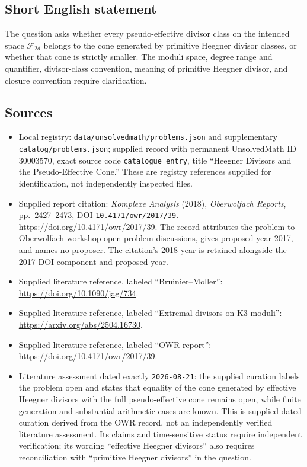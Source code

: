 \documentclass[11pt]{article}
\begin{document}
\subsection{Short English statement}
The question asks whether every pseudo-effective divisor class on the intended space \(\mathcal F_{2d}\) belongs to the cone generated by primitive Heegner divisor classes, or whether that cone is strictly smaller. The moduli space, degree range and quantifier, divisor-class convention, meaning of primitive Heegner divisor, and closure convention require clarification.
\subsection{Sources}
\begin{itemize}
\item Local registry: \texttt{data/unsolvedmath/problems.json} and supplementary \texttt{catalog/problems.json}; supplied record with permanent UnsolvedMath ID \(30003570\), exact source code \texttt{catalogue entry}, title ``Heegner Divisors and the Pseudo-Effective Cone.'' These are registry references supplied for identification, not independently inspected files.
\item Supplied report citation: \emph{Komplexe Analysis} (2018), \emph{Oberwolfach Reports}, pp.\ 2427--2473, DOI \texttt{10.4171/owr/2017/39}. \url{https://doi.org/10.4171/owr/2017/39}. The record attributes the problem to Oberwolfach workshop open-problem discussions, gives proposed year 2017, and names no proposer. The citation's 2018 year is retained alongside the 2017 DOI component and proposed year.
\item Supplied literature reference, labeled ``Bruinier--Moller'': \url{https://doi.org/10.1090/jag/734}.
\item Supplied literature reference, labeled ``Extremal divisors on K3 moduli'': \url{https://arxiv.org/abs/2504.16730}.
\item Supplied literature reference, labeled ``OWR report'': \url{https://doi.org/10.4171/owr/2017/39}.
\item Literature assessment dated exactly \texttt{2026-08-21}: the supplied curation labels the problem open and states that equality of the cone generated by effective Heegner divisors with the full pseudo-effective cone remains open, while finite generation and substantial arithmetic cases are known. This is supplied dated curation derived from the OWR record, not an independently verified literature assessment. Its claims and time-sensitive status require independent verification; its wording ``effective Heegner divisors'' also requires reconciliation with ``primitive Heegner divisors'' in the question.
\end{itemize}
\end{document}
